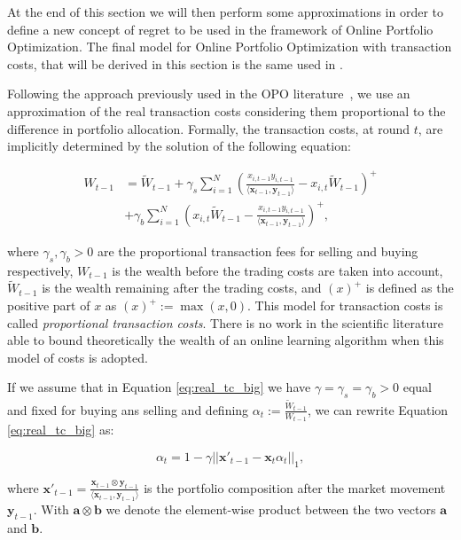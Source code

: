 At the end of this section we will then perform some approximations in order to define a new concept of regret to be used in the framework of Online Portfolio Optimization. The final model for Online Portfolio Optimization with transaction costs, that will be derived in this section is the same used in \cite{das2013online}.

Following the approach previously used in the OPO literature~\cite{blum1999universal}, we use an approximation of the real transaction costs considering them proportional to the difference in portfolio allocation.
Formally, the transaction costs, at round $t$, are implicitly determined by the solution of the following equation:

\begin{align}\label{eq:real_tc_big}
W_{t-1}&=\tilde W_{t-1}+\gamma_s\sum\limits_{i=1}^N\left(\frac{x_{i,t-1}y_{i,t-1}}{\langle \mathbf x_{t-1},\mathbf y_{t-1}\rangle}-x_{i,t}\tilde W_{t-1}\right)^+\\\nonumber
&+\gamma_b\sum\limits_{i=1}^N\left(x_{i,t}\tilde W_{t-1}-\frac{x_{i,t-1}y_{i,t-1}}{\langle \mathbf x_{t-1},\mathbf y_{t-1}\rangle}\right)^+,
\end{align}

where $\gamma_s,\gamma_b>0$ are the proportional transaction fees for selling and buying respectively, $W_{t-1}$ is the wealth before the trading costs are taken into account, $\tilde W_{t-1}$ is the wealth remaining after the trading costs, and $(x)^+$ is defined as the positive part of $x$ as $(x)^+:=\max(x,0)$.
This model for transaction costs is called \emph{proportional transaction costs}. There is no work in the scientific literature able to bound theoretically the wealth of an online learning algorithm when this model of costs is adopted.

If we assume that in Equation \eqref{eq:real_tc_big} we have $\gamma=\gamma_s=\gamma_b>0$ equal and fixed for buying ans selling and defining $\alpha_t:=\frac{\tilde W_{t-1}}{W_{t-1}}$, we can rewrite Equation \eqref{eq:real_tc_big} as:

\begin{equation}\label{eq:real_tc}
   \alpha_t = 1 - \gamma ||\mathbf{x}'_{t-1}-\mathbf{x}_t \alpha_{t} ||_1,
\end{equation}

where $\mathbf{x'}_{t-1} = \frac{\mathbf{x}_{t-1} \otimes \mathbf{y}_{t-1} }{\langle \mathbf{x}_{t-1}, \mathbf{y}_{t-1} \rangle }$ is the portfolio composition after the market movement $\mathbf{y}_{t-1}$.  With $ \mathbf{a} \otimes \mathbf{b}$ we denote the element-wise product between the two vectors $\mathbf{a}$ and $\mathbf{b}$.

